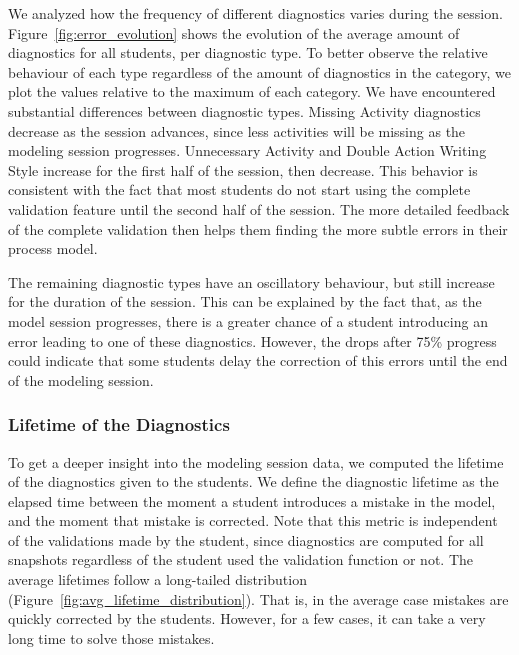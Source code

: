 \newcommand{\expnumber}[2]{{#1}\mathrm{e}{#2}}

We analyzed how the frequency of different diagnostics varies during the session. Figure~\ref{fig:error_evolution} shows the evolution of the average amount of diagnostics for all students, per diagnostic type. To better observe the relative behaviour of each type regardless of the amount of diagnostics in the category, we plot the values relative to the maximum of each category. We have encountered substantial differences between diagnostic types. 
Missing Activity diagnostics decrease as the session advances, since less activities will be missing as the modeling session progresses.
Unnecessary Activity and Double Action Writing Style increase for the first half of the session, then decrease. This behavior is consistent with the fact that most students do not start using the complete validation feature until the second half of the session. The more detailed feedback of the complete validation then helps them finding the more subtle errors in their process model.


The remaining diagnostic types have an oscillatory behaviour, but still increase for the duration of the session. This can be explained by the fact that, as the model session progresses, there is a greater chance of a student introducing an error leading to one of these diagnostics. However, the drops after 75\% progress could indicate that some students delay the correction of this errors until the end of the modeling session.

\subsubsection{Lifetime of the Diagnostics}
To get a deeper insight into the modeling session data, we computed the lifetime of the diagnostics given to the students. We define the diagnostic lifetime as the elapsed time between the moment a student introduces a mistake in the model, and the moment that mistake is corrected. Note that this metric is independent of the validations made by the student, since diagnostics are computed for all snapshots regardless of the student used the validation function or not.
The average lifetimes follow a long-tailed distribution (Figure~\ref{fig:avg_lifetime_distribution}). That is, in the average case mistakes are quickly corrected by the students. However, for a few cases, it can take a very long time to solve those mistakes. 


